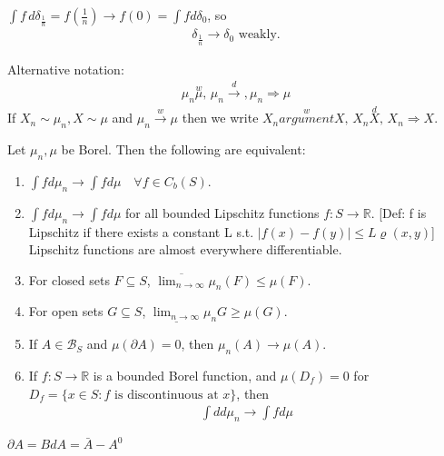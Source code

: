 \documentclass[11pt]{article}
\begin{document}
\begin{example}
    $\int f \, d \delta_{\frac{1}{n}} = f(\frac{1}{n}) \longrightarrow f(0) = \int f d \delta_{0}$, so 
    \begin{align*}
        \delta_{\frac{1}{n}} \longrightarrow \delta_{0} \text{ weakly}.
    \end{align*}
\end{example}

Alternative notation:
\begin{align*}
    \mu_{n} \overset{w}{\mu}, \, \mu_{n} \overset{d}{\longrightarrow}, \mu_n \Longrightarrow \mu
\end{align*}
If $X_n \sim \mu_{n}, X \sim \mu$ and $\mu_n \overset{w}{\longrightarrow}\mu$ then we write 
$X_n \overset{w}{argument} X,\, X_n \overset{d}{X}, \, X_n \Longrightarrow X$.

\begin{theorem}
    Let $\mu_{n}, \mu$ be Borel. Then the following are equivalent:
    \begin{enumerate}
        \item $\int f d \mu_n \longrightarrow \int f d \mu \quad \forall f \in C_{b}(S)$.
        \item $\int f d \mu_n \longrightarrow \int f d \mu$ for all bounded Lipschitz functions 
        $f: S \to \mathbb{R}$. [Def: f is Lipschitz if there exists a constant L s.t. $
        |f(x) - f(y)| \le L\varrho(x,y)$] Lipschitz functions are almost everywhere differentiable.
        \item For closed sets $F \subseteq S$, $\overline{\lim_{n \to \infty}}\mu_n(F) \le \mu(F)$.
        \item For open sets $G \subseteq S$, $\underline{\lim_{n \to \infty}} \mu_{n}G \ge \mu(G)$.
        \item If $A \in \mathcal{B}_{S}$ and $\mu(\partial A) = 0$, then $\mu_{n}(A) \longrightarrow \mu(A)$.
        \item If $f: S \to \mathbb{R}$ is a bounded Borel function, and $\mu(D_{f}) = 0$ for 
        $D_{f} = \{ x \in S: f \text{ is discontinuous at }x \}$, then 
        \begin{align*}
            \int d d \mu_{n} \longrightarrow \int f d \mu
        \end{align*}
    \end{enumerate}
\end{theorem}
\begin{remark}
    $\partial A = Bd A = \bar{A} - A^{0}$
\end{remark}
\end{document}
